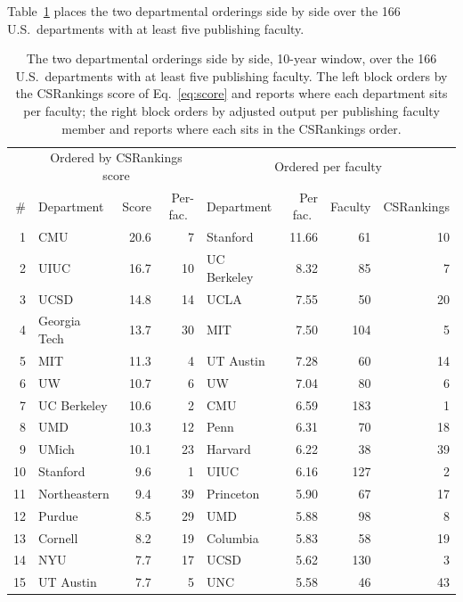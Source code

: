 \documentclass[11pt]{article}
\newcommand{\csr}{CSRankings}
\begin{document}
Table~\ref{tab:percapita} places the two departmental orderings side by side
over the 166 U.S.\ departments with at least five publishing faculty.

\begin{table}[t]
\centering
\small
\caption{The two departmental orderings side by side, 10-year window, over the
166 U.S.\ departments with at least five publishing faculty. The left block
orders by the \csr{} score of Eq.~\ref{eq:score} and reports where each
department sits per faculty; the right block orders by adjusted output per
publishing faculty member and reports where each sits in the \csr{} order.}
\label{tab:percapita}
\begin{tabular}{r@{\hskip 1.5em}lrr@{\hskip 2.5em}lrrr}
\toprule
& \multicolumn{3}{c}{Ordered by \csr{} score} & \multicolumn{4}{c}{Ordered per faculty} \\
\cmidrule(r{1.2em}){2-4}\cmidrule(l){5-8}
\# & Department & Score & Per-fac.\ & Department & Per fac.\ & Faculty & \csr{} \\
\midrule
1  & CMU          & 20.6 & 7  & Stanford     & 11.66 & 61  & 10 \\
2  & UIUC         & 16.7 & 10 & UC Berkeley  & 8.32  & 85  & 7  \\
3  & UCSD         & 14.8 & 14 & UCLA         & 7.55  & 50  & 20 \\
4  & Georgia Tech & 13.7 & 30 & MIT          & 7.50  & 104 & 5  \\
5  & MIT          & 11.3 & 4  & UT Austin    & 7.28  & 60  & 14 \\
6  & UW           & 10.7 & 6  & UW           & 7.04  & 80  & 6  \\
7  & UC Berkeley  & 10.6 & 2  & CMU          & 6.59  & 183 & 1  \\
8  & UMD          & 10.3 & 12 & Penn         & 6.31  & 70  & 18 \\
9  & UMich        & 10.1 & 23 & Harvard      & 6.22  & 38  & 39 \\
10 & Stanford     & 9.6  & 1  & UIUC         & 6.16  & 127 & 2  \\
11 & Northeastern & 9.4  & 39 & Princeton    & 5.90  & 67  & 17 \\
12 & Purdue       & 8.5  & 29 & UMD          & 5.88  & 98  & 8  \\
13 & Cornell      & 8.2  & 19 & Columbia     & 5.83  & 58  & 19 \\
14 & NYU          & 7.7  & 17 & UCSD         & 5.62  & 130 & 3  \\
15 & UT Austin    & 7.7  & 5  & UNC          & 5.58  & 46  & 43 \\
\bottomrule
\end{tabular}
\end{table}
\end{document}
